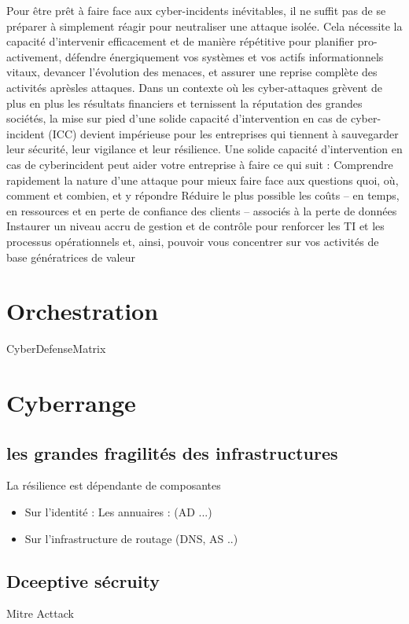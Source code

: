 



Pour être prêt à faire face aux cyber-incidents inévitables, il ne suffit pas de se préparer à simplement réagir pour neutraliser une attaque isolée. Cela nécessite la capacité d’intervenir efficacement et de manière répétitive pour planifier pro-activement, défendre énergiquement vos systèmes et vos actifs informationnels vitaux, devancer l’évolution des menaces, et assurer une reprise complète des activités aprèsles attaques.
Dans un contexte où les cyber-attaques grèvent de plus en plus les résultats financiers et ternissent la réputation des grandes sociétés, la mise sur pied d’une solide capacité d’intervention en cas de cyber-incident (ICC) devient impérieuse pour les entreprises qui tiennent à sauvegarder leur sécurité, leur vigilance et leur résilience. Une solide capacité d’intervention en cas de cyberincident peut aider votre entreprise à faire ce qui suit :
Comprendre rapidement la nature d’une attaque pour mieux faire face aux questions quoi, où, comment et combien, et y répondre
Réduire le plus possible les coûts – en temps, en ressources et en perte de confiance des clients – associés à la perte de données
Instaurer un niveau accru de gestion et de contrôle pour renforcer les TI et les processus opérationnels et, ainsi, pouvoir vous concentrer sur vos activités de base génératrices de valeur

\section{Orchestration}

CyberDefenseMatrix  

\section{Cyberrange}



\subsection {les grandes fragilités des infrastructures}

La résilience est dépendante de composantes 
\begin{itemize}
  \item Sur l'identité : Les annuaires : (AD ...)
  \item Sur l'infrastructure de routage (DNS, AS ..)
\end{itemize}

\subsection {Dceeptive sécruity}
Mitre Acttack


